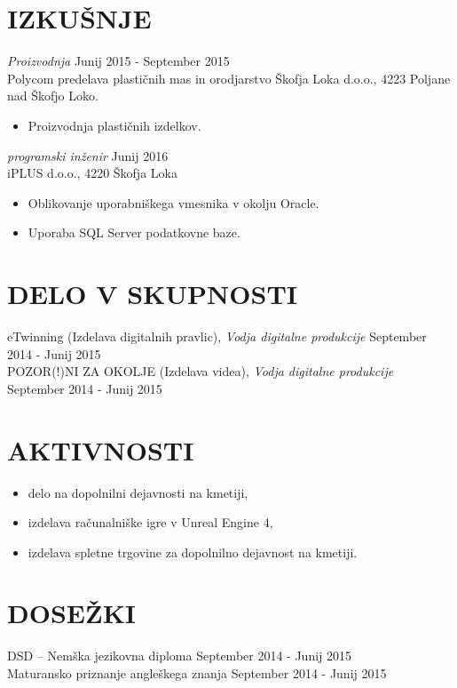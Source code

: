 \documentclass[margin, 10pt]{res} %
\begin{document}
\begin{resume}
\section{IZKUŠNJE}
{\sl Proizvodnja} \hfill Junij 2015 - September 2015 \\
Polycom predelava plastičnih mas in orodjarstvo Škofja Loka d.o.o., 4223 Poljane nad Škofjo Loko.
\begin{itemize} \itemsep -2pt %
	\item Proizvodnja plastičnih izdelkov.
\end{itemize}

{\sl programski inženir} \hfill Junij 2016\\
iPLUS d.o.o., 4220 Škofja Loka
\begin{itemize}
\item Oblikovanje uporabniškega vmesnika v okolju Oracle.
\item Uporaba SQL Server podatkovne baze.

\end{itemize} 



\section{DELO V SKUPNOSTI}

eTwinning (Izdelava digitalnih pravlic), {\sl Vodja digitalne produkcije} \hfill September 2014 - Junij 2015 \\
POZOR(!)NI ZA OKOLJE (Izdelava videa), {\sl Vodja digitalne produkcije} \hfill September 2014 - Junij 2015 \\



\section{AKTIVNOSTI} 
\begin{itemize}
	\item delo na dopolnilni dejavnosti na kmetiji,
	\item izdelava računalniške igre v Unreal Engine 4,
	\item izdelava spletne trgovine za dopolnilno dejavnost na kmetiji.
\end{itemize} 

\section{DOSEŽKI} 

DSD – Nemška jezikovna diploma \hfill September 2014 - Junij 2015\\
Maturansko priznanje angleškega znanja \hfill September 2014 - Junij 2015\\



\end{resume}
\end{document}
